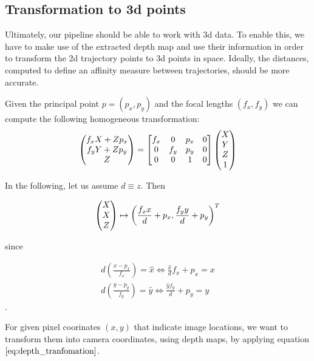 \subsection{Transformation to 3d points}
\label{subsection:transform_to_3d_points}
Ultimately, our pipeline should be able to work with 3d data. To enable this, we have to make use of the extracted depth map and use their information in order to transform the 2d trajectory points to 3d points in space. Ideally, the distances, computed to define an affinity measure between trajectories, should be more accurate. 

Given the principal point $p = \left(p_x, p_y \right)$ and the focal lengths $\left(f_x, f_y \right)$ we can compute the following homogeneous transformation:
\begin{equation}
\colvec[f_x X + Z p_x]{f_y Y + Z p_y}{Z} =
\begin{bmatrix}
f_x & 0 & p_x & 0 \\
0 & f_y & p_y & 0 \\
0 & 0 & 1 & 0
\end{bmatrix}
\begin{pmatrix}
X \\
Y \\
Z \\
1
\end{pmatrix}
\end{equation}

In the following, let us assume $d \equiv z$. Then

\begin{equation}
	\colvec[X]{X}{Z} \mapsto \left( \frac{f_x x}{d} + p_x, \frac{f_y y}{d} + p_y \right)^T
\end{equation}

since

\begin{equation}
\begin{aligned}
	d \left( \frac{x - p_x}{f_x} \right) = \hat{x} \Leftrightarrow \frac{\hat{x}}{d} f_x + p_x = x \\
	d \left( \frac{y - p_y}{f_y} \right) = \hat{y} \Leftrightarrow \frac{\hat{y} f_y}{d} + p_y = y 
\end{aligned}
\label{eq:depth_tranfomation}
\end{equation}.

For given pixel coorinates $\left( x,y \right)$ that indicate image locations, we want to transform them into camera coordinates, using depth maps, by applying equation $\ref{eq:depth_tranfomation}$.

